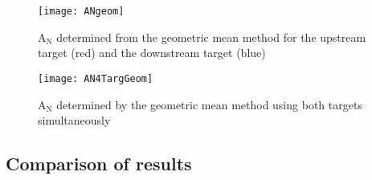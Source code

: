 \begin{figure}[h!t]
  \begin{center}
    \texttt{[image: ANgeom]} 
    \caption{A$_{\mathrm{N}}$ determined from the geometric mean method for the
      upstream target (red) and the downstream target (blue)}
    \label{fig::ANgeom}
  \end{center}
\end{figure}

\begin{figure}[h!t]
  \begin{center}
    \texttt{[image: AN4TargGeom]}
    \caption{A$_{\mathrm{N}}$ determined by the geometric mean method using both
      targets simultaneously}
    \label{fig::AN4TargGeom}
  \end{center}
\end{figure}

\subsection{Comparison of results}

